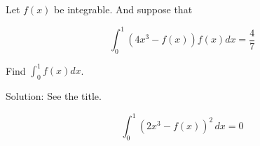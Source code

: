 \documentclass[11]{article}
\title{\sc{Thala for a Reason}}
\author{\sc{Rahul}}
\date{\today}
\begin{document}
\maketitle
Let $f(x)$ be integrable. And suppose that

$$\int_0^1 (4x^3 - f(x))f(x) dx = \frac{4}{7}$$

Find $\int_0^1 f(x) dx$.

Solution: See the title.

$$\int_0^{1}\left(2x^3-f(x)\right)^2\, dx=0$$
\end{document}
